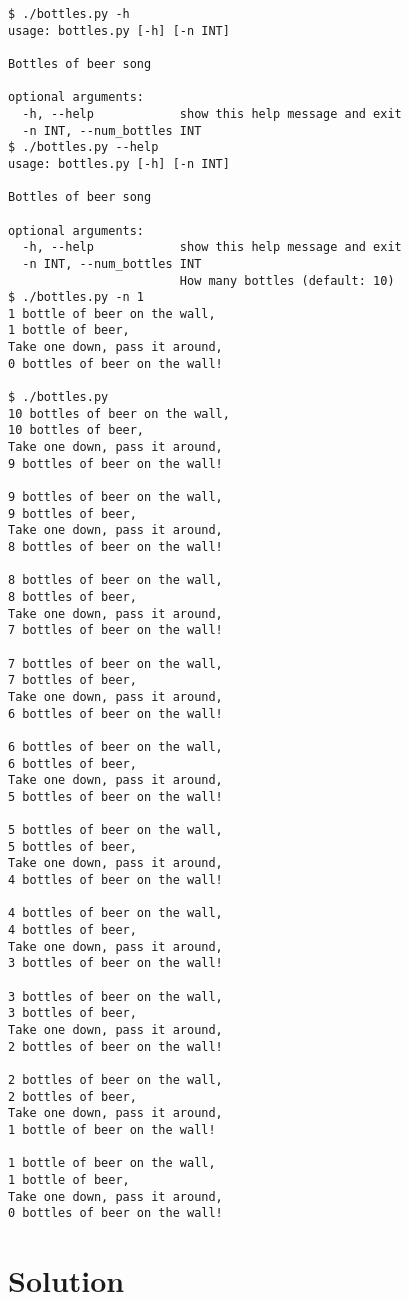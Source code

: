 \documentclass[]{article}
\begin{document}
\begin{verbatim}
$ ./bottles.py -h
usage: bottles.py [-h] [-n INT]

Bottles of beer song

optional arguments:
  -h, --help            show this help message and exit
  -n INT, --num_bottles INT
$ ./bottles.py --help
usage: bottles.py [-h] [-n INT]

Bottles of beer song

optional arguments:
  -h, --help            show this help message and exit
  -n INT, --num_bottles INT
                        How many bottles (default: 10)
$ ./bottles.py -n 1
1 bottle of beer on the wall,
1 bottle of beer,
Take one down, pass it around,
0 bottles of beer on the wall!

$ ./bottles.py
10 bottles of beer on the wall,
10 bottles of beer,
Take one down, pass it around,
9 bottles of beer on the wall!

9 bottles of beer on the wall,
9 bottles of beer,
Take one down, pass it around,
8 bottles of beer on the wall!

8 bottles of beer on the wall,
8 bottles of beer,
Take one down, pass it around,
7 bottles of beer on the wall!

7 bottles of beer on the wall,
7 bottles of beer,
Take one down, pass it around,
6 bottles of beer on the wall!

6 bottles of beer on the wall,
6 bottles of beer,
Take one down, pass it around,
5 bottles of beer on the wall!

5 bottles of beer on the wall,
5 bottles of beer,
Take one down, pass it around,
4 bottles of beer on the wall!

4 bottles of beer on the wall,
4 bottles of beer,
Take one down, pass it around,
3 bottles of beer on the wall!

3 bottles of beer on the wall,
3 bottles of beer,
Take one down, pass it around,
2 bottles of beer on the wall!

2 bottles of beer on the wall,
2 bottles of beer,
Take one down, pass it around,
1 bottle of beer on the wall!

1 bottle of beer on the wall,
1 bottle of beer,
Take one down, pass it around,
0 bottles of beer on the wall!
\end{verbatim}

\pagebreak

\hypertarget{solution-2}{%
\section{Solution}\label{solution-2}}
\end{document}
